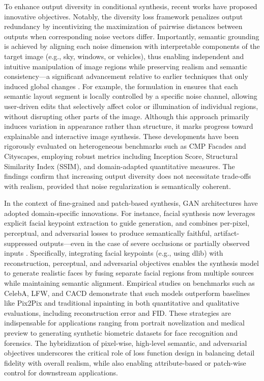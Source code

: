 \documentclass[sigconf]{acmart}
\begin{document}
To enhance output diversity in conditional synthesis, recent works have proposed innovative objectives. Notably, the diversity loss framework penalizes output redundancy by incentivizing the maximization of pairwise distances between outputs when corresponding noise vectors differ. Importantly, semantic grounding is achieved by aligning each noise dimension with interpretable components of the target image (e.g., sky, windows, or vehicles), thus enabling independent and intuitive manipulation of image regions while preserving realism and semantic consistency---a significant advancement relative to earlier techniques that only induced global changes \cite{ref93}. For example, the formulation in \cite{ref93} ensures that each semantic layout segment is locally controlled by a specific noise channel, allowing user-driven edits that selectively affect color or illumination of individual regions, without disrupting other parts of the image. Although this approach primarily induces variation in appearance rather than structure, it marks progress toward explainable and interactive image synthesis. These developments have been rigorously evaluated on heterogeneous benchmarks such as CMP Facades and Cityscapes, employing robust metrics including Inception Score, Structural Similarity Index (SSIM), and domain-adapted quantitative measures. The findings confirm that increasing output diversity does not necessitate trade-offs with realism, provided that noise regularization is semantically coherent.

In the context of fine-grained and patch-based synthesis, GAN architectures have adopted domain-specific innovations. For instance, facial synthesis now leverages explicit facial keypoint extraction to guide generation, and combines per-pixel, perceptual, and adversarial losses to produce semantically faithful, artifact-suppressed outputs---even in the case of severe occlusions or partially observed inputs \cite{ref97}. Specifically, integrating facial keypoints (e.g., using dlib) with reconstruction, perceptual, and adversarial objectives enables the synthesis model to generate realistic faces by fusing separate facial regions from multiple sources while maintaining semantic alignment. Empirical studies on benchmarks such as CelebA, LFW, and CACD demonstrate that such models outperform baselines like Pix2Pix and traditional inpainting in both quantitative and qualitative evaluations, including reconstruction error and FID. These strategies are indispensable for applications ranging from portrait novelization and medical preview to generating synthetic biometric datasets for face recognition and forensics. The hybridization of pixel-wise, high-level semantic, and adversarial objectives underscores the critical role of loss function design in balancing detail fidelity with overall realism, while also enabling attribute-based or patch-wise control for downstream applications.
\end{document}
